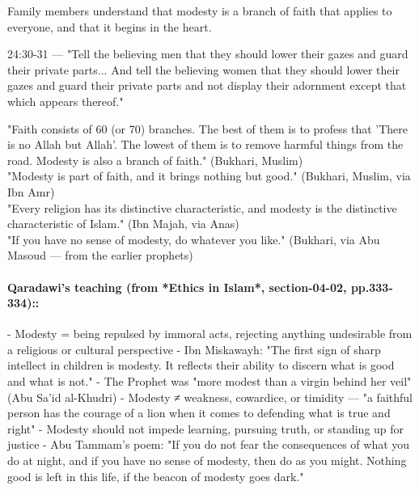 \documentclass[11pt,a4paper]{article}
\begin{document}
\begin{outcomebox} Family members understand that modesty is a branch of faith that applies to everyone, and that it begins in the heart. \end{outcomebox}

\begin{quranbox} 24:30-31 --- "Tell the believing men that they should lower their gazes and guard their private parts... And tell the believing women that they should lower their gazes and guard their private parts and not display their adornment except that which appears thereof." \end{quranbox}

\begin{hadithbox} "Faith consists of 60 (or 70) branches. The best of them is to profess that 'There is no Allah but Allah'. The lowest of them is to remove harmful things from the road. Modesty is also a branch of faith." (Bukhari, Muslim) \\ "Modesty is part of faith, and it brings nothing but good." (Bukhari, Muslim, via Ibn Amr) \\ "Every religion has its distinctive characteristic, and modesty is the distinctive characteristic of Islam." (Ibn Majah, via Anas) \\ "If you have no sense of modesty, do whatever you like." (Bukhari, via Abu Masoud --- from the earlier prophets) \end{hadithbox}

\paragraph*{Qaradawi's teaching (from *Ethics in Islam*, section-04-02, pp.333-334)::}  - Modesty = being repulsed by immoral acts, rejecting anything undesirable from a religious or cultural perspective - Ibn Miskawayh: "The first sign of sharp intellect in children is modesty. It reflects their ability to discern what is good and what is not." - The Prophet was "more modest than a virgin behind her veil" (Abu Sa'id al-Khudri) - Modesty ≠ weakness, cowardice, or timidity --- "a faithful person has the courage of a lion when it comes to defending what is true and right" - Modesty should not impede learning, pursuing truth, or standing up for justice - Abu Tammam's poem: "If you do not fear the consequences of what you do at night, and if you have no sense of modesty, then do as you might. Nothing good is left in this life, if the beacon of modesty goes dark."
\end{document}
